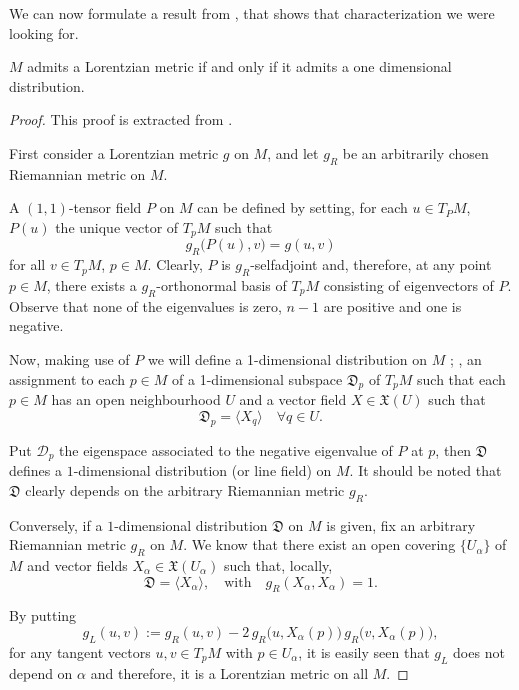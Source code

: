 We can now formulate a result from \cite{greub72}, that shows that characterization we were looking for.

\begin{proposition}
	\label{pro:onedimensional}
	$M$ admits a Lorentzian metric if and only if it admits a one dimensional distribution.
\end{proposition}

\begin{proof}
	This proof is extracted from \cite[p. 204]{romero10}.
	
	First consider a Lorentzian metric $g$ on $M$, and let $g_R$ be an arbitrarily chosen Riemannian metric on $M$.
	
	A $(1,1)$-tensor field $P$ on $M$ can be defined by setting, for each $u \in T_PM$, $P(u)$ the unique vector of $T_pM$ such that
	\[
	g_R\big(P(u),v\big)=g(u,v)
	\]
	for all $v \in T_pM$, $p \in M$. Clearly, $P$ is $g_R$-selfadjoint and, therefore, at any point $p \in M$, there exists a $g_R$-orthonormal basis of $T_pM$ consisting of eigenvectors of $P$. Observe that none of the eigenvalues is zero, $n-1$ are positive and one is negative.
	
	Now, making use of $P$ we will define a 1-dimensional distribution on $M$ \cite{kobnom63}; \ie, an assignment to each $p \in M$ of a 1-dimensional subspace $\mathfrak{D}_p$ of $T_p M$ such that each $p\in M$ has an open neighbourhood $U$ and a vector field $X \in \mathfrak{X}(U)$ such that 
	\[
	\mathfrak{D}_p = \langle X_q \rangle \quad \forall q \in U.
	\]
	
	Put $\mathcal{D}_p$ the eigenspace associated to the negative eigenvalue of $P$ at $p$, then $\mathfrak{D}$ defines a $1$-dimensional distribution (or line field) on $M$. It should be noted that $\mathfrak{D}$ clearly depends on the arbitrary Riemannian metric $g_R$.
	
	Conversely, if a $1$-dimensional distribution $\mathfrak{D}$ on $M$ is given, fix an arbitrary Riemannian metric $g_R$ on $M$. We know that there exist an open covering $\{U_{\alpha}\}$ of $M$ and vector fields $X_\alpha \in \mathfrak{X}(U_\alpha)$ such that, locally,
	\[
	\mathfrak{D}=\langle X_{\alpha} \rangle, \quad \mathrm{with} \quad
	g_R(X_{\alpha},X_{\alpha})=1.
	\]
	
	By putting
	\[
	g_{L}(u,v):=g_{R}(u,v)-2\,g_{R}\big(u,X_{\alpha}(p)\big)\,g_{R}\big(v,X_{\alpha}(p)\big),
	\]
	for any tangent vectors $u,v \in T_{p}M$ with $p\in U_\alpha$, it is easily seen that $g_{L}$ does not depend on $\alpha$ and therefore, it is a Lorentzian metric on all $M$.
\end{proof}

